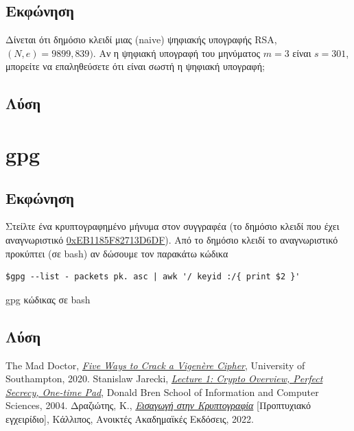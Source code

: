 \documentclass[oneside]{article}
\begin{document}
\subsection{Εκφώνηση} 

Δίνεται ότι δημόσιο κλειδί μιας (naive) ψηφιακής υπογραφής RSA, $(N, e) = 9899, 839)$. Αν η ψηφιακή υπογραφή του μηνύματος $m = 3$ είναι $s = 301$, μπορείτε να επαληθεύσετε ότι είναι σωστή η ψηφιακή υπογραφή;

\subsection{Λύση}

\section{gpg}

\subsection{Εκφώνηση} 

Στείλτε ένα κρυπτογραφημένο μήνυμα στον συγγραφέα (το δημόσιο κλειδί που έχει αναγνωριστικό \href{https://github.com/drazioti/my_public_key/blob/main/pk.asc}{0xEB1185F82713D6DF}). Από το δημόσιο κλειδί το αναγνωριστικό προκύπτει (σε bash) αν δώσουμε τον παρακάτω κώδικα

\begin{listing}[H]
\begin{verbatim}
$gpg --list - packets pk. asc | awk '/ keyid :/{ print $2 }'
\end{verbatim}
\caption{gpg κώδικας σε bash}
\label{algo:bash}
\end{listing}

\subsection{Λύση}

\begin{thebibliography}{3} 
     The Mad Doctor, \emph{\href{https://www.cipherchallenge.org/wp-content/uploads/2020/12/Five-ways-to-crack-a-Vigenere-cipher.pdf}{Five Ways to Crack a Vigenère Cipher}}, University of Southampton, 2020.
     Stanislaw Jarecki, \emph{\href{https://www.ics.uci.edu/\%7Estasio/fall04/lect1.pdf}{Lecture 1: Crypto Overview, Perfect Secrecy, One-time Pad}}, Donald Bren School of Information and Computer Sciences, 2004.
     Δραζιώτης, Κ., \emph{\href{https://repository.kallipos.gr/handle/11419/8016?&locale=el}{Εισαγωγή στην Κρυπτογραφία}} [Προπτυχιακό εγχειρίδιο], Κάλλιπος, Ανοικτές Ακαδημαϊκές Εκδόσεις, 2022.
\end{thebibliography}
\end{document}

